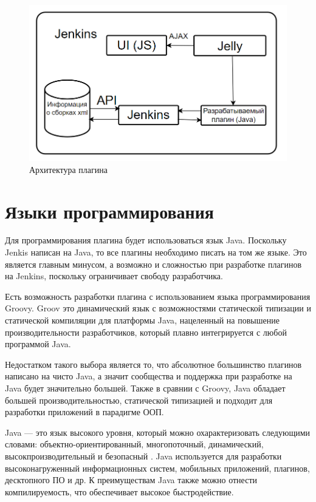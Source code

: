 \begin{figure}[ht!] 
	\center
	\includegraphics [scale=0.47] {my_folder/images//archpl}
	\caption{Архитектура плагина} 
	\label{fig:ArchitectureJenkins}  
\end{figure}


\section{Языки программирования} \label{ch1:sec4}

Для программирования плагина будет использоваться язык Java. Поскольку Jenkis написан на Java, то все плагины необходимо писать на том же языке. Это является главным минусом, а возможно и сложностью при разработке плагинов на Jenkins, поскольку ограничивает свободу разработчика.

Есть возможность разработки плагина с использованием языка программирования Groovy. Groov это динамический язык с возможностями статической типизации и статической компиляции для платформы Java\cite{groovy}, нацеленный на повышение производительности разработчиков, который плавно интегрируется с любой программой Java.

Недостатком такого выбора является то, что абсолютное большинство плагинов написано на чисто Java, а значит сообщества и поддержка при разработке на Java будет значительно большей. Также в сравнии с Groovy, Java обладает большей производительностью\cite{groovyvsjava}, статической типизацией и подходит для разработки приложений в парадигме ООП.

Java — это язык высокого уровня, который можно охарактеризовать следующими словами: объектно-ориентированный, многопоточный, динамический, высокпроизводительный и безопасный \cite{java}. Java используется для разработки высоконагруженный информационных систем, мобильных приложений, плагинов, десктопного ПО и др. К преимуществам Java также можно отнести компилируемость, что обеспечивает высокое быстродействие.

